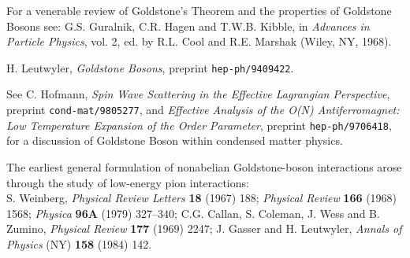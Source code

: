 \begin{thebibliography}{99}
For a venerable review of Goldstone's Theorem and the properties of
Goldstone Bosons see: G.S. Guralnik, C.R. Hagen and T.W.B. Kibble, 
in {\it Advances in Particle Physics}, vol. 2, ed. by R.L. Cool 
and R.E. Marshak (Wiley, NY, 1968).

H. Leutwyler, {\sl Goldstone Bosons}, preprint {\tt hep-ph/9409422}.

See C. Hofmann, {\sl Spin Wave Scattering in the Effective Lagrangian Perspective}, preprint
{\tt cond-mat/9805277}, and {\sl Effective Analysis of the O(N) Antiferromagnet:
Low Temperature Expansion of the Order Parameter}, preprint {\tt hep-ph/9706418},
for a discussion of Goldstone Boson within condensed matter physics.

The earliest general formulation of nonabelian
Goldstone-boson interactions 
arose through the study of low-energy pion interactions:\\
S. Weinberg, {\it Physical Review Letters} {\bf 18} (1967) 188;
{\it Physical Review}  {\bf 166} (1968) 1568; 
{\it Physica} {\bf 96A} (1979) 327--340; 
C.G. Callan, S. Coleman, J. Wess and B. Zumino, {\it Physical Review}
{\bf 177} (1969) 2247;
J. Gasser and H. Leutwyler, 
{\it Annals of Physics} (NY) {\bf 158} (1984) 142.


\end{thebibliography}


